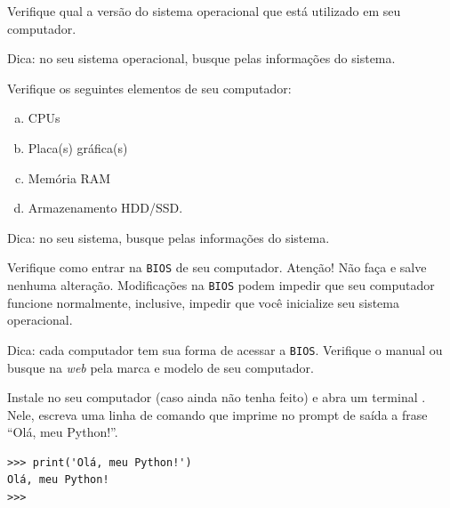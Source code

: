 
\begin{exer}
  Verifique qual a versão do sistema operacional que está utilizado em seu computador.
\end{exer}
\begin{resp}
  Dica: no seu sistema operacional, busque pelas informações do sistema.
\end{resp}

\begin{exer}
  Verifique os seguintes elementos de seu computador:
  \begin{enumerate}[a)]
  \item CPUs
  \item Placa(s) gráfica(s)
  \item Memória RAM
  \item Armazenamento HDD/SSD.
  \end{enumerate}
\end{exer}
\begin{resp}
  Dica: no seu sistema, busque pelas informações do sistema.
\end{resp}

\begin{exer}
  Verifique como entrar na \lstinline+BIOS+ de seu computador. Atenção! Não faça e salve nenhuma alteração. Modificações na \lstinline+BIOS+ podem impedir que seu computador funcione normalmente, inclusive, impedir que você inicialize seu sistema operacional.
\end{exer}
\begin{resp}
  Dica: cada computador tem sua forma de acessar a \lstinline+BIOS+. Verifique o manual ou busque na \textit{web} pela marca e modelo de seu computador.
\end{resp}

\begin{exer}
  Instale {\python} no seu computador (caso ainda não tenha feito) e abra um terminal {\python}. Nele, escreva uma linha de comando que imprime no prompt de saída a frase ``Olá, meu Python!''.
\end{exer}
\begin{resp}

\begin{lstlisting}
>>> print('Olá, meu Python!')
Olá, meu Python!
>>> 
\end{lstlisting}

\end{resp}


